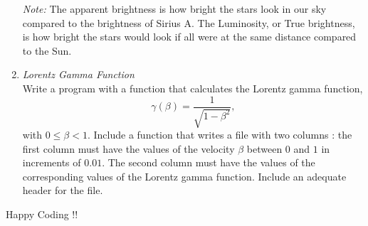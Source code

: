 \documentclass[10pt,letterpaper,notitlepage]{report}
\begin{document}
\begin{enumerate}
\textit{Note:} The apparent brightness is how bright the stars look in our sky compared to the brightness of Sirius A. The Luminosity, or True brightness, is how bright the stars would look if all were at the same distance compared to the Sun.

\item \textit{Lorentz Gamma Function}\\

Write a program with a function that calculates the Lorentz gamma function,
\begin{equation}
\gamma (\beta) = \frac{1}{\sqrt{1-\beta^2}},
\end{equation}
with $0 \leq \beta < 1$.  Include a function that writes a file with two columns : the first column must have the values of the velocity $\beta$ between $0$ and $1$ in increments of $0.01$. The second column must have the values of the corresponding values of the Lorentz gamma function. Include an adequate header for the file.

\end{enumerate}

Happy Coding !!
\end{document}
